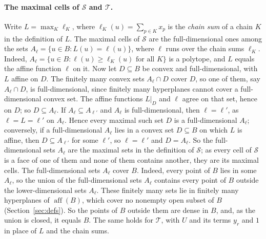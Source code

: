 \documentclass[11pt]{article}
\theoremstyle{definition}
\theoremstyle{remark}
\newcommand{\SSS}{\mathcal S}
\newcommand{\TT}{\mathcal T}
\newcommand{\aff}{\operatorname{aff}}
\begin{document}
\paragraph{The maximal cells of $\SSS$ and $\TT$.}
Write $L=\max_K\ell_K$, where $\ell_K(u)=\sum_{p\in K}x_p$ is the \emph{chain sum} of a chain $K$ in the definition of $L$. The maximal cells of
$\SSS$ are the full-dimensional ones among the sets $A_\ell=\{u\in B:L(u)=\ell(u)\}$, where $\ell$ runs over the chain sums $\ell_K$.
Indeed, $A_\ell=\{u\in B:\ell(u)\geq\ell_K(u)\text{ for all }K\}$ is a polytope, and $L$ equals the affine function $\ell$ on it. Now let $D\subseteq B$ be convex and full-dimensional, with $L$ affine on $D$. The finitely many convex sets $A_\ell\cap D$ cover $D$, so one of them, say $A_\ell\cap D$, is full-dimensional, since finitely many hyperplanes cannot cover a full-dimensional convex set. The affine functions $L|_D$ and $\ell$ agree on that set, hence on $D$; so $D\subseteq A_\ell$. If $A_\ell\subseteq A_{\ell'}$ and $A_\ell$ is full-dimensional, then $\ell=\ell'$, as $\ell=L=\ell'$ on $A_\ell$. Hence every maximal
such set $D$ is a full-dimensional $A_\ell$; conversely, if a full-dimensional $A_\ell$ lies in a convex
set $D\subseteq B$ on which $L$ is affine, then $D\subseteq A_{\ell'}$ for some $\ell'$, so $\ell=\ell'$ and $D=A_\ell$. So the full-dimensional sets $A_\ell$ are the maximal sets in the definition of $\SSS$; as every cell of $\SSS$ is a face of one of them and none of them contains another, they are its maximal cells. The full-dimensional sets $A_\ell$ cover $B$. Indeed, every point of $B$ lies in some $A_\ell$, so the union of the full-dimensional sets $A_\ell$ contains every point of $B$ outside the lower-dimensional sets $A_\ell$. These finitely many sets lie in finitely many hyperplanes of $\aff(B)$, which cover no nonempty open subset of $B$ (Section~\ref{sec:defs}). So the points of $B$ outside them are dense in $B$, and, as the union is closed, it equals $B$. The same holds for $\TT$, with $U$ and its terms $y_r$ and $1$ in place of $L$ and the chain sums.
\end{document}
